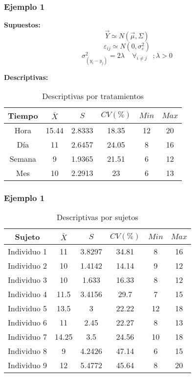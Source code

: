 \documentclass[12pt]{beamer}
\begin{document}
\begin{frame}
\frametitle{Ejemplo 1}
\textbf{Supuestos:} 
$$\vec{Y} \simeq N(\vec{\mu},\Sigma)$$
$$\varepsilon_{ij} \simeq N(0,\sigma^2_\varepsilon)$$
$$\sigma^2_{(y_i-y_j)}=2\lambda  \;\;\;\; \forall_{i\neq j} \;\;\; ; \lambda>0$$ 

\textbf{Descriptivas:}
\begin{table}[htbp]
  \centering
\resizebox{12cm}{!} {
\begin{tabular}{|c|c|c|c|c|c|}
\hline 
\textbf{Tiempo} & \textbf{$\bar{X}$} & \textbf{$S$} & \textbf{$CV(\%)$} & \textbf{$Min$} & \textbf{$Max$}\\ 
\hline 
Hora & 15.44 &2.8333& 18.35& 12 & 20\\
Día & 11 & 2.6457 & 24.05& 8 & 16\\
Semana & 9 &1.9365& 21.51& 6 & 12\\
Mes & 10 &2.2913& 23& 6 & 13 \\
\hline 
\end{tabular} 
}
\caption{Descriptivas por tratamientos}
\label{tab:addlabel}%
\end{table}%
\end{frame}

\begin{frame}
\frametitle{Ejemplo 1}
\begin{table}[htbp]
  \centering
\resizebox{12cm}{!} {
\begin{tabular}{|c|c|c|c|c|c|}
\hline 
\textbf{Sujeto} & \textbf{$\bar{X}$} & \textbf{$S$} & \textbf{$CV(\%)$} & \textbf{$Min$} & \textbf{$Max$}\\ 
\hline 
Individuo 1 & 11 &3.8297 &34.81& 8 & 16\\
Individuo 2 & 10 &1.4142 & 14.14& 9 & 12\\
Individuo 3 & 10 &1.633 & 16.33& 8 & 12\\
Individuo 4 & 11.5    &3.4156 & 29.7& 7 & 15\\
Individuo 5 & 13.5    &3 & 22.22& 12 & 18\\
Individuo 6 & 11    &2.45 & 22.27& 8 & 13\\
Individuo 7 & 14.25    &3.5 &24.56& 10 & 18\\
Individuo 8 &  9   &4.2426 & 47.14& 6 & 15\\
Individuo 9 &12    &5.4772 & 45.64& 8 & 20\\
\hline 
\end{tabular} 
}
\caption{Descriptivas por sujetos}
\label{tab:addlabel}%
\end{table}%
\end{frame}
\end{document}
